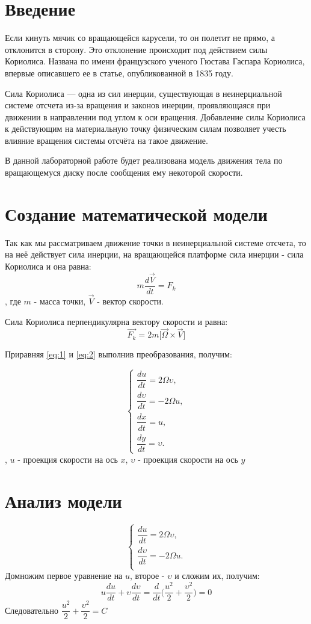 \documentclass[a4paper, 14pt]{extarticle}
\begin{document}
	\pagebreak	

	\section{Введение}	
		Если кинуть мячик со вращающейся карусели, то он полетит не прямо, а отклонится в сторону. Это отклонение происходит под действием силы Кориолиса. Названа по имени французского ученого Гюстава Гаспара Кориолиса, впервые описавшего ее в статье, опубликованной в 1835 году.
		
 		Сила Кориолиса — одна из сил инерции, существующая в неинерциальной системе отсчета из-за вращения и законов инерции, проявляющаяся при движении в направлении под углом к оси вращения. Добавление силы Кориолиса к действующим на материальную точку физическим силам позволяет учесть влияние вращения системы отсчёта на такое движение. 
 		
 		В данной лабораторной работе будет реализована модель движения тела по вращающемуся диску после сообщения ему некоторой скорости.

	\section{Создание математической модели}
		Так как мы рассматриваем движение точки в неинерциальной системе отсчета, то на неё действует сила  инерции, на вращающейся платформе сила инерции - сила Кориолиса и она равна:
		\[ m\dfrac{d\vec{V}}{dt} = F_k \tag{1} \label{eq:1} \], где
		$m$ - масса точки, $\vec{V}$ - вектор скорости.
		
		Сила Кориолиса перпендикулярна вектору скорости и равна:
		\[ \vec{F_k} = 2 m \Big[\vec{\Omega}\times\vec{V}\Big] \tag{2} \label{eq:2} \]
		
		Приравняя \eqref{eq:1} и \eqref{eq:2} выполнив преобразования, получим:
		
		\[\begin{cases}
			\dfrac{du}{dt} = 2\Omega\upsilon,\\
			\dfrac{d\upsilon}{dt} = -2\Omega u,\\
			\dfrac{dx}{dt} = u,\\
			\dfrac{dy}{dt} = \upsilon.
		\end{cases}\],
		$u$ - проекция скорости на ось $x$, $\upsilon$ - проекция скорости на ось $y$
		
	\section{Анализ модели}
		\[\begin{cases}
			\dfrac{du}{dt} = 2\Omega\upsilon,\\
			\dfrac{d\upsilon}{dt} = -2\Omega u.\\
		\end{cases}\]
		Домножим первое уравнение на $u$, второе - $\upsilon$  и сложим их, получим:
		\[u\dfrac{du}{dt} + \upsilon\dfrac{d\upsilon}{dt} = \dfrac{d}{dt}\Bigg( \dfrac{u^2}{2} + \dfrac{\upsilon^2}{2} \Bigg) = 0 \]
		Следовательно $ \dfrac{u^2}{2} + \dfrac{\upsilon^2}{2} = C$
	
\end{document}
